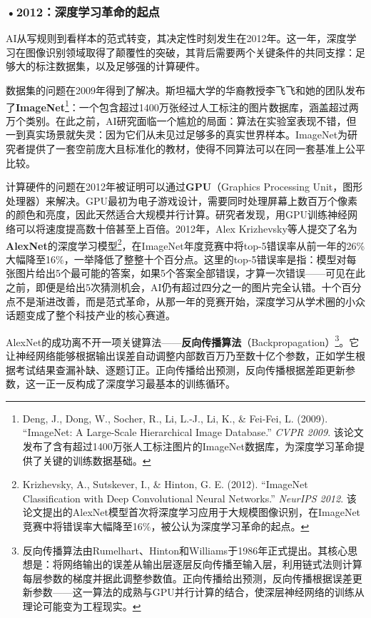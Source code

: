 \subsubsection*{\textbf{•2012：深度学习革命的起点}}

AI从写规则到看样本的范式转变，其决定性时刻发生在2012年。这一年，深度学习在图像识别领域取得了颠覆性的突破，其背后需要两个关键条件的共同支撑：足够大的标注数据集，以及足够强的计算硬件。

数据集的问题在2009年得到了解决。斯坦福大学的华裔教授李飞飞和她的团队发布了\textbf{ImageNet}\footnote{Deng, J., Dong, W., Socher, R., Li, L.-J., Li, K., \& Fei-Fei, L. (2009). ``ImageNet: A Large-Scale Hierarchical Image Database.'' \emph{CVPR 2009}. 该论文发布了含有超过1400万张人工标注图片的ImageNet数据库，为深度学习革命提供了关键的训练数据基础。}：一个包含超过1400万张经过人工标注的图片数据库，涵盖超过两万个类别。在此之前，AI研究面临一个尴尬的局面：算法在实验室表现不错，但一到真实场景就失灵：因为它们从未见过足够多的真实世界样本。ImageNet为研究者提供了一套空前庞大且标准化的教材，使得不同算法可以在同一套基准上公平比较。

计算硬件的问题在2012年被证明可以通过\textbf{GPU}（Graphics Processing Unit，图形处理器）来解决。GPU最初为电子游戏设计，需要同时处理屏幕上数百万个像素的颜色和亮度，因此天然适合大规模并行计算。研究者发现，用GPU训练神经网络可以将速度提高数十倍甚至上百倍。2012年，Alex Krizhevsky等人提交了名为\textbf{AlexNet}的深度学习模型\footnote{Krizhevsky, A., Sutskever, I., \& Hinton, G. E. (2012). ``ImageNet Classification with Deep Convolutional Neural Networks.'' \emph{NeurIPS 2012}. 该论文提出的AlexNet模型首次将深度学习应用于大规模图像识别，在ImageNet竞赛中将错误率大幅降至16\%，被公认为深度学习革命的起点。}，在ImageNet年度竞赛中将top-5错误率从前一年的26\%大幅降至16\%，一举降低了整整十个百分点。这里的top-5错误率是指：模型对每张图片给出5个最可能的答案，如果5个答案全部错误，才算一次错误——可见在此之前，即便是给出5次猜测机会，AI仍有超过四分之一的图片完全认错。十个百分点不是渐进改善，而是范式革命，从那一年的竞赛开始，深度学习从学术圈的小众话题变成了整个科技产业的核心赛道。

AlexNet的成功离不开一项关键算法——\textbf{反向传播算法}（Backpropagation）\footnote{反向传播算法由Rumelhart、Hinton和Williams于1986年正式提出。其核心思想是：将网络输出的误差从输出层逐层反向传播至输入层，利用链式法则计算每层参数的梯度并据此调整参数值。正向传播给出预测，反向传播根据误差更新参数——这一算法的成熟与GPU并行计算的结合，使深层神经网络的训练从理论可能变为工程现实。}。它让神经网络能够根据输出误差自动调整内部数百万乃至数十亿个参数，正如学生根据考试结果查漏补缺、逐题订正。正向传播给出预测，反向传播根据差距更新参数，这一正一反构成了深度学习最基本的训练循环。


